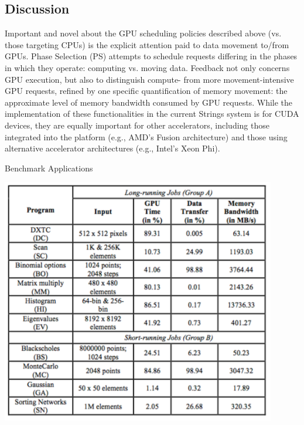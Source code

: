 \subsection{Discussion}
Important and novel about the GPU scheduling policies described above (vs. those targeting CPUs) is the explicit attention paid to data movement to/from GPUs. Phase Selection (PS) attempts to schedule requests differing in the phases in which they operate: computing vs. moving data. Feedback not only concerns GPU execution, but also to distinguish compute- from more movement-intensive GPU requests, refined by one specific quantification of memory movement: the approximate level of memory bandwidth consumed by GPU requests. While the implementation of these functionalities in the current Strings system is for CUDA devices, they are equally important for other accelerators, including those integrated into the platform (e.g., AMD’s Fusion architecture) and those using alternative accelerator architectures (e.g., Intel’s Xeon Phi).

\begin{table}[!t] 
\caption{{Benchmark Applications}}
\centering 
\label{tbl:table} 
\includegraphics[width=0.9\textwidth,height=\textheight,keepaspectratio]{figures/Strings_Table.pdf}
\end{table}

